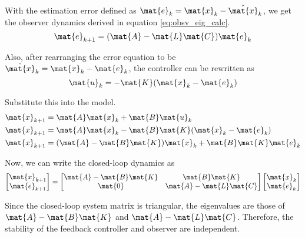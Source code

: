 With the estimation error defined as $\mat{e}_k = \mat{x}_k - \hat{\mat{x}}_k$,
we get the observer dynamics derived in equation \eqref{eq:obsv_eig_calc}.
\begin{equation*}
  \mat{e}_{k+1} = (\mat{A} - \mat{L}\mat{C})\mat{e}_k
\end{equation*}

Also, after rearranging the error equation to be
$\hat{\mat{x}}_k = \mat{x}_k - \mat{e}_k$, the controller can be rewritten as
\begin{equation*}
  \mat{u}_k = -\mat{K}(\mat{x}_k - \mat{e}_k)
\end{equation*}

Substitute this into the model.
\begin{align*}
  \mat{x}_{k+1} &= \mat{A}\mat{x}_k + \mat{B}\mat{u}_k \\
  \mat{x}_{k+1} &= \mat{A}\mat{x}_k - \mat{B}\mat{K}(\mat{x}_k - \mat{e}_k) \\
  \mat{x}_{k+1} &= (\mat{A} - \mat{B}\mat{K})\mat{x}_k + \mat{B}\mat{K}\mat{e}_k
\end{align*}

Now, we can write the closed-loop dynamics as
\begin{equation*}
  \begin{bmatrix}
    \mat{x}_{k+1} \\
    \mat{e}_{k+1}
  \end{bmatrix} =
  \begin{bmatrix}
    \mat{A} - \mat{B}\mat{K} & \mat{B}\mat{K} \\
    \mat{0} & \mat{A} - \mat{L}\mat{C}
  \end{bmatrix}
  \begin{bmatrix}
    \mat{x}_k \\
    \mat{e}_k
  \end{bmatrix}
\end{equation*}

Since the closed-loop system matrix is triangular, the eigenvalues are those of
$\mat{A} - \mat{B}\mat{K}$ and $\mat{A} - \mat{L}\mat{C}$. Therefore, the
stability of the feedback controller and observer are independent.
